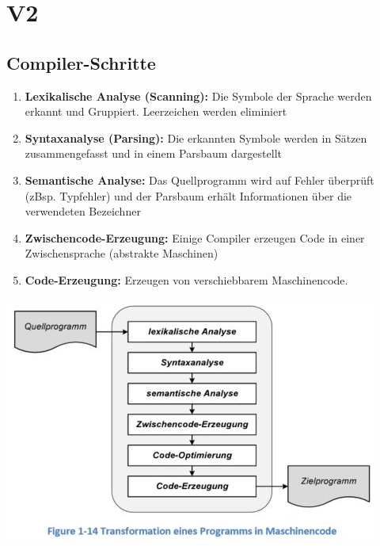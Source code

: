 \section{V2}
\subsection{Compiler-Schritte}
\vspace{-0.5cm}
\begin{multicols}{2}
    \begin{minipage}{\linewidth}
        \begin{enumerate}
            \item \textbf{Lexikalische Analyse (Scanning):}\newline
                Die Symbole der Sprache werden erkannt und Gruppiert. Leerzeichen werden eliminiert
            \item \textbf{Syntaxanalyse (Parsing):}\newline
                 Die erkannten Symbole werden in Sätzen zusammengefasst und in einem Parsbaum dargestellt
            \item \textbf{Semantische Analyse:}\newline
                 Das Quellprogramm wird auf Fehler überprüft (zBsp. Typfehler) und der Parsbaum erhält Informationen über die verwendeten Bezeichner
            \item \textbf{Zwischencode-Erzeugung:}\newline
                 Einige Compiler erzeugen Code in einer Zwischensprache (abstrakte Maschinen)
            \item \textbf{Code-Erzeugung:}\newline
                 Erzeugen von verschiebbarem Maschinencode.      
        \end{enumerate}
    \end{minipage}

    \includegraphics[width=\linewidth]{images/CompilerWorkflow2}
\end{multicols}

